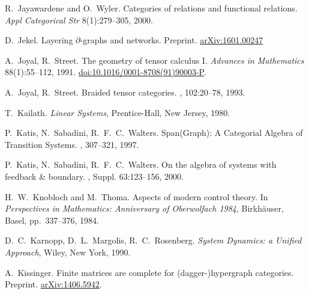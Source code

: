 \begin{thebibliography}{RSW00}
    R.\ Jayawardene and O.\ Wyler.
    \newblock Categories of relations and functional relations.
    \newblock \emph{Appl Categorical Str} 8(1):279--305, 2000.
    
    D.\ Jekel.
    \newblock Layering $\partial$-graphs and networks. 
    \newblock Preprint.
    \newblock \href{http://arxiv.org/abs/1601.00247}{arXiv:1601.00247}

    A.\ Joyal, R.\ Street.
    \newblock The geometry of tensor calculus I.
    \newblock \emph{Advances in Mathematics} { 88}(1):55--112, 1991.
    \newblock \href{http://doi.org/10.1016/0001-8708(91)90003-P}{doi:10.1016/0001-8708(91)90003-P}.

    A.\ Joyal, R.\ Street.
    \newblock Braided tensor categories.
    , { 102}:20--78, 1993.

    T.\ Kailath.
    \newblock \emph{Linear Systems}, Prentice-Hall, New Jersey, 1980.

    P.\ Katis, N.\ Sabadini, R.\ F.\ C.\ Walters.
    \newblock Span(Graph): A Categorial Algebra of Transition Systems.
    , 307--321, 1997. 

    P.\ Katis, N.\ Sabadini, R.\ F.\ C.\ Walters.
    \newblock On the algebra of systems with feedback \& boundary.
    ,
    Suppl. { 63}:123--156, 2000.

    H.\ W.\ Knobloch and M.\ Thoma.
    \newblock Aspects of modern control theory. 
      \newblock In {\sl Perspectives in Mathematics: Anniversary of Oberwolfach
      1984}, Birkh\"auser, Basel, pp.\ 337--376, 1984. 


    D.\ C.\ Karnopp, D.\ L.\ Margolis, R.\ C.\ Rosenberg.
    \newblock \textsl{System Dynamics: a Unified Approach}, Wiley, New York, 1990.

    A.\ Kissinger.
    \newblock Finite matrices are complete for (dagger-)hypergraph categories.
    \newblock Preprint.
    \newblock \href{http://arxiv.org/abs/1406.5942}{arXiv:1406.5942}.


\end{thebibliography}
